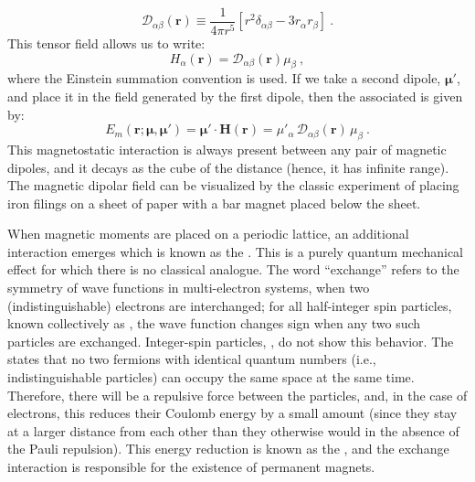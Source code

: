 \begin{equation}
	\mathcal{D}_{\alpha\beta}(\mathbf{r})\equiv \frac{1}{4\pi r^5}\left[ r^2\delta_{\alpha\beta}-3r_{\alpha} r_{\beta}\right]\ .\label{\chabbr:eq:dipolartensor}
\end{equation}
This  tensor field allows us to write:
\begin{equation}
	H_\alpha(\mathbf{r}) = \mathcal{D}_{\alpha\beta}(\mathbf{r}) \mu_\beta\ ,\label{\chabbr:eq:Halpha}
\end{equation}
where the Einstein summation convention is used.  If we take a second dipole, $\bm{\mu}'$, and place it in the field generated by the first dipole, then the associated  is given by:
\begin{equation}
	E_m(\mathbf{r};\bm{\mu},\bm{\mu}') = \bm{\mu}'\cdot \mathbf{H}(\mathbf{r})= \mu'_\alpha\,\mathcal{D}_{\alpha\beta}(\mathbf{r})\, \mu_\beta\ .\label{\chabbr:eq:maginteraction}
\end{equation}
This magnetostatic interaction is always present between any pair of magnetic dipoles, and it decays as the cube of the distance (hence, it has infinite range).  The magnetic dipolar field can be visualized by the classic experiment of placing iron filings on a sheet of paper with a bar magnet placed below the sheet.  

When magnetic moments are placed on a periodic lattice, an additional interaction emerges which is known as the .  This is a purely quantum mechanical effect for which there is no classical analogue.  The word ``exchange'' refers to the symmetry of wave functions in multi-electron systems, when two (indistinguishable)  electrons are interchanged; for all half-integer spin particles, known collectively as , the wave function changes sign when any two such particles are exchanged.  Integer-spin particles, , do not show this behavior.  The  states that no two fermions with identical quantum numbers (i.e., indistinguishable particles) can occupy the same space at the same time.  Therefore, there will be a repulsive force between the particles, and, in the case of electrons, this reduces their Coulomb energy by a small amount (since they stay at a larger distance from each other than they otherwise would in the absence of the Pauli repulsion). This energy reduction is known as the , and the exchange interaction is responsible for the existence of permanent magnets.  


